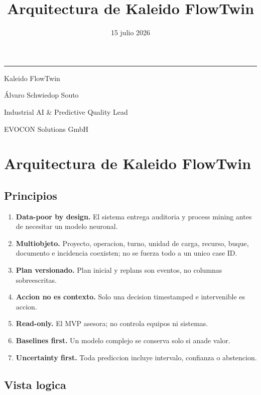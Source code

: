 \documentclass[
  spanish,
  10pt,
  a4paper,
]{article}
\title{Arquitectura de Kaleido FlowTwin}
\author{}
\date{15 julio 2026}
\makeatletter
\providecommand{\tightlist}{%
  \setlength{\itemsep}{0pt}\setlength{\parskip}{0pt}}
\renewcommand{\maketitle}{%
  \hypersetup{pageanchor=false}
  \begin{titlepage}
    \pagecolor{KaleidoNavy}
    \color{white}
    \vspace*{1.4cm}
    {\color{KaleidoCyan}\rule{2.4cm}{2.5pt}\par}
    \vspace{1.1cm}
    {\Huge\bfseries\@title\par}
    \vspace{0.65cm}
    {\Large\color{KaleidoMint}Kaleido FlowTwin\par}
    \vfill
    {\large Álvaro Schwiedop Souto\par}
    \vspace{0.15cm}
    {\normalsize\color{KaleidoMint}Industrial AI \& Predictive Quality Lead\par}
    \vspace{0.15cm}
    {\normalsize\color{KaleidoMint}EVOCON Solutions GmbH\par}
    \vspace{0.25cm}
    {\normalsize\color{KaleidoMint}\@date\par}
  \end{titlepage}
  \hypersetup{pageanchor=true}
  \nopagecolor
  \color{black}
}
\makeatother
\begin{document}
\maketitle

{
\setcounter{tocdepth}{3}
\tableofcontents
}
\section{Arquitectura de Kaleido
FlowTwin}\label{arquitectura-de-kaleido-flowtwin}

\subsection{Principios}\label{principios}

\begin{enumerate}
\def\labelenumi{\arabic{enumi}.}
\tightlist
\item
  \textbf{Data-poor by design.} El sistema entrega auditoria y process
  mining antes de necesitar un modelo neuronal.
\item
  \textbf{Multiobjeto.} Proyecto, operacion, turno, unidad de carga,
  recurso, buque, documento e incidencia coexisten; no se fuerza todo a
  un unico case ID.
\item
  \textbf{Plan versionado.} Plan inicial y replans son eventos, no
  columnas sobreescritas.
\item
  \textbf{Accion no es contexto.} Solo una decision timestamped e
  intervenible es accion.
\item
  \textbf{Read-only.} El MVP asesora; no controla equipos ni sistemas.
\item
  \textbf{Baselines first.} Un modelo complejo se conserva solo si anade
  valor.
\item
  \textbf{Uncertainty first.} Toda prediccion incluye intervalo,
  confianza o abstencion.
\end{enumerate}

\subsection{Vista logica}\label{vista-logica}
\end{document}
